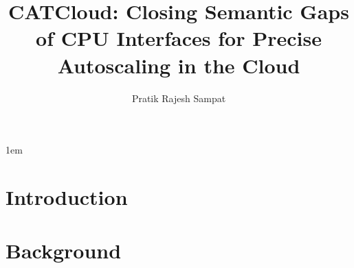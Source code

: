 \documentclass[tocnosub,noragright,centerchapter,fullpagesingle,12pt]{uiuc_csthesis21}
\title{CATCloud: Closing Semantic Gaps of CPU Interfaces for Precise Autoscaling in the Cloud}
\author{Pratik Rajesh Sampat}
\theoremstyle{definition}
\numberwithin{algocf}{chapter}     %
\begin{document}
%

%
\maketitle

\parindent 1em%

\frontmatter

%
\begin{abstract}
\end{abstract}

%

%
\begin{acknowledgments}
\end{acknowledgments}

%
\tableofcontents

\mainmatter

%

\chapter{Introduction}
\label{chp:intro}

\chapter{Background}
\label{chp:backgronund}

\end{document}
